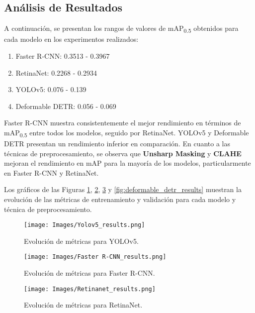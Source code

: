 \subsection{Análisis de Resultados}

A continuación, se presentan los rangos de valores de mAP\textsubscript{0.5} obtenidos para cada modelo en los experimentos realizados:

\begin{enumerate}
    \item Faster R-CNN: 0.3513 - 0.3967
    \item RetinaNet: 0.2268 - 0.2934
    \item YOLOv5: 0.076 - 0.139
    \item Deformable DETR: 0.056 - 0.069
\end{enumerate}

Faster R-CNN muestra consistentemente el mejor rendimiento en términos de mAP\textsubscript{0.5} entre todos los modelos, seguido por RetinaNet. YOLOv5 y Deformable DETR presentan un rendimiento inferior en comparación. En cuanto a las técnicas de preprocesamiento, se observa que \textbf{Unsharp Masking} y \textbf{CLAHE} mejoran el rendimiento en mAP para la mayoría de los modelos, particularmente en Faster R-CNN y RetinaNet.

Los gráficos de las Figuras \ref{fig:yolov5_results}, \ref{fig:faster_rcnn_results}, \ref{fig:retinanet_results} y \ref{fig:deformable_detr_results} muestran la evolución de las métricas de entrenamiento y validación para cada modelo y técnica de preprocesamiento.

\begin{figure}[htbp]
    \centering
    \texttt{[image: Images/Yolov5\_results.png]}
    \caption{Evolución de métricas para YOLOv5.}
    \label{fig:yolov5_results}
\end{figure}

\begin{figure}[htbp]
    \centering
    \texttt{[image: Images/Faster R-CNN\_results.png]}
    \caption{Evolución de métricas para Faster R-CNN.}
    \label{fig:faster_rcnn_results}
\end{figure}

\begin{figure}[htbp]
    \centering
    \texttt{[image: Images/Retinanet\_results.png]}
    \caption{Evolución de métricas para RetinaNet.}
    \label{fig:retinanet_results}
\end{figure}

